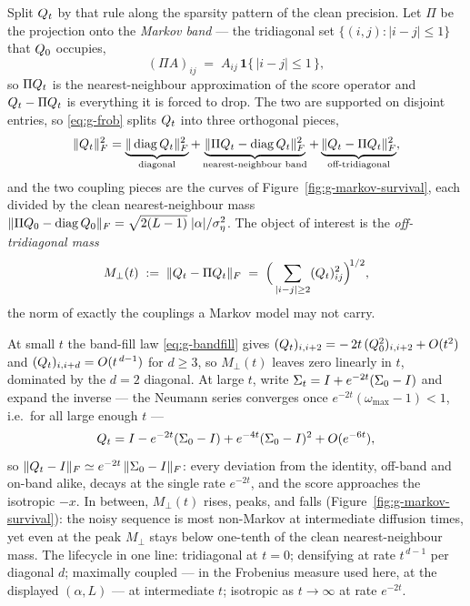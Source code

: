Split $Q_t$ by that rule along the sparsity pattern of the clean precision. Let
$\Pi$ be the projection onto the \emph{Markov band} --- the tridiagonal set
$\{(i,j) : |i-j| \le 1\}$ that $Q_0$ occupies,
\begin{equation}
  (\Pi A)_{ij} \;=\; A_{ij}\,\mathbf{1}\{\,|i-j| \le 1\,\},
  \label{eq:g-bandproj}
\end{equation}
so $\Pi Q_t$ is the nearest-neighbour
approximation of the score operator and $Q_t - \Pi Q_t$ is everything it is
forced to drop. The two are supported on disjoint entries, so \eqref{eq:g-frob}
splits $Q_t$ into three orthogonal pieces,
\begin{equation}
  \|Q_t\|_F^2
  = \underbrace{\|\operatorname{diag}Q_t\|_F^2}_{\text{diagonal}}
  + \underbrace{\|\Pi Q_t - \operatorname{diag}Q_t\|_F^2}_{\text{nearest-neighbour band}}
  + \underbrace{\|Q_t - \Pi Q_t\|_F^2}_{\text{off-tridiagonal}} ,
  \label{eq:g-frob-split}
\end{equation}
and the two coupling pieces are the curves of
Figure~\ref{fig:g-markov-survival}, each divided by the clean nearest-neighbour
mass
$\|\Pi Q_0 - \operatorname{diag}Q_0\|_F = \sqrt{2(L-1)}\;|\alpha|/\sigma_\eta^2$.
The object of interest is the \emph{off-tridiagonal mass}
\begin{equation}
  M_\perp(t) \;:=\; \|Q_t - \Pi Q_t\|_F
  \;=\; \Big(\sum_{|i-j|\ge 2}(Q_t)_{ij}^2\Big)^{\!1/2},
  \label{eq:g-offmass}
\end{equation}
the norm of exactly the couplings a Markov model may not carry.

At small $t$ the band-fill law \eqref{eq:g-bandfill} gives
$(Q_t)_{i,i+2} = -\,2t\,(Q_0^{2})_{i,i+2} + O(t^2)$ and
$(Q_t)_{i,i+d} = O(t^{\,d-1})$ for $d \ge 3$, so $M_\perp(t)$ leaves zero
linearly in $t$, dominated by the $d = 2$ diagonal. At large $t$, write
$\Sigma_t = I + e^{-2t}(\Sigma_0 - I)$ and expand the inverse --- the Neumann series
converges once $e^{-2t}(\omega_{\max} - 1) < 1$, i.e.\ for all large enough
$t$ ---
\begin{equation}
  Q_t = I - e^{-2t}(\Sigma_0 - I) + e^{-4t}(\Sigma_0 - I)^2 + O(e^{-6t}),
  \label{eq:g-larget}
\end{equation}
so $\|Q_t - I\|_F \simeq e^{-2t}\,\|\Sigma_0 - I\|_F$: every deviation from the
identity, off-band and on-band alike, decays at the single rate $e^{-2t}$, and
the score approaches the isotropic $-x$. In between, $M_\perp(t)$ rises, peaks,
and falls (Figure~\ref{fig:g-markov-survival}): the noisy sequence is most
non-Markov at intermediate diffusion times, yet even at the peak $M_\perp$
stays below one-tenth of the clean nearest-neighbour mass. The lifecycle in one line: tridiagonal at $t = 0$; densifying
at rate $t^{\,d-1}$ per diagonal $d$; maximally coupled --- in the Frobenius
measure used here, at the displayed $(\alpha, L)$ --- at intermediate $t$;
isotropic as $t \to \infty$ at rate $e^{-2t}$.


